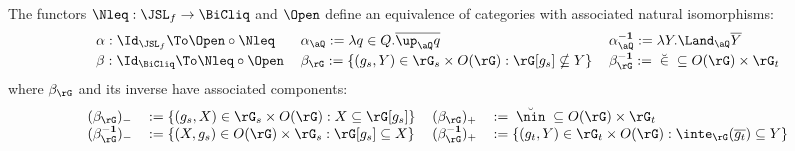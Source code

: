\documentclass{article}
\begin{document}
\begin{theorem}
\label{thm:jsl_bicliq_equiv_without_irr}
\item
The functors $\Nleq : \JSL_f \to \BiCliq$ and $\Open$ define an equivalence of categories with associated natural isomorphisms:
\[
\begin{tabular}{lll}
$\alpha :  \Id_{\JSL_f} \To \Open \circ \Nleq$
&
$\alpha_\aQ := \lambda q \in Q. \overline{\up_\aQ q}$
&
$\alpha_\aQ^{\bf-1} := \lambda Y. \Land_\aQ \overline{Y}$
\\[0.5ex]
$\beta : \Id_{\BiCliq} \To \Nleq \circ \Open$
&
$\beta_\rG := \{ (g_s,Y) \in \rG_s \times O(\rG) : \rG[g_s] \nsubseteq Y \}$
&
$\beta_\rG^{\bf-1} := \; \breve{\in} \; \subseteq O(\rG) \times \rG_t$
\end{tabular}
\]
where $\beta_\rG$ and its inverse have associated components:
\[
\begin{tabular}{llll}
$(\beta_\rG)_-$ & $:= \{ (g_s,X) \in \rG_s \times O(\rG) : X \subseteq \rG[g_s] \}$
&
$(\beta_\rG)_+$ & $:=  \; \breve{\nin} \; \subseteq O(\rG) \times \rG_t$
\\
$(\beta_\rG^{\bf-1})_-$ & $:= \{ (X,g_s) \in O(\rG) \times \rG_s : \rG[g_s] \subseteq X \}$
&
$(\beta_\rG^{\bf-1})_+$ & $:= \{ (g_t,Y) \in \rG_t \times O(\rG) : \inte_\rG(\overline{g_t}) \subseteq Y \}$
\end{tabular}
\]
\end{theorem}
\end{document}
